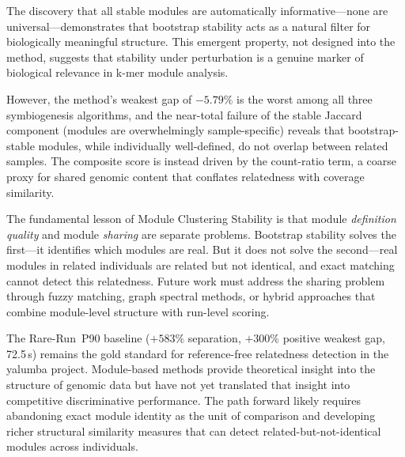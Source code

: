 \documentclass{../yalumba}
\begin{document}
The discovery that all stable modules are automatically informative---none are
universal---demonstrates that bootstrap stability acts as a natural filter for
biologically meaningful structure.  This emergent property, not designed into
the method, suggests that stability under perturbation is a genuine marker of
biological relevance in k-mer module analysis.

However, the method's weakest gap of $-5.79\%$ is the worst among all three
symbiogenesis algorithms, and the near-total failure of the stable Jaccard
component (modules are overwhelmingly sample-specific) reveals that
bootstrap-stable modules, while individually well-defined, do not overlap
between related samples.  The composite score is instead driven by the
count-ratio term, a coarse proxy for shared genomic content that conflates
relatedness with coverage similarity.

The fundamental lesson of Module Clustering Stability is that module
\emph{definition quality} and module \emph{sharing} are separate problems.
Bootstrap stability solves the first---it identifies which modules are real.
But it does not solve the second---real modules in related individuals are
related but not identical, and exact matching cannot detect this relatedness.
Future work must address the sharing problem through fuzzy matching, graph
spectral methods, or hybrid approaches that combine module-level structure
with run-level scoring.

The Rare-Run~P90 baseline ($+583\%$ separation, $+300\%$ positive weakest gap,
72.5\,s) remains the gold standard for reference-free relatedness detection in
the yalumba project.  Module-based methods provide theoretical insight into the
structure of genomic data but have not yet translated that insight into
competitive discriminative performance.  The path forward likely requires
abandoning exact module identity as the unit of comparison and developing
richer structural similarity measures that can detect related-but-not-identical
modules across individuals.





\end{document}
